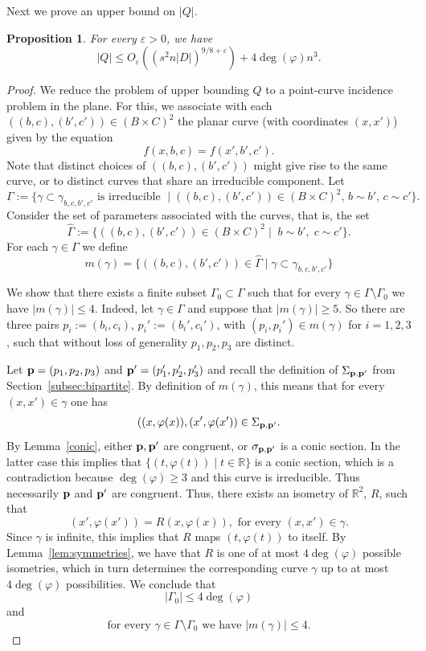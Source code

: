 \documentclass[letterpaper, reqno,11pt]{article}
\newcommand{\RR}{\mathbb{R}}
\newcommand{\eps}{\varepsilon}
\newcommand{\p}{{\bf p}}
\newtheorem{prop}[thm]{Proposition}
\theoremstyle{definition}
\theoremstyle{remark}
\begin{document}
Next we prove an upper bound on $|Q|$.
\begin{prop}\label{prop:upperQ}
For every $\eps>0$, we have
$$
|Q|\le O_\eps\left( (s^2n|D|)^{9/8+\eps}\right)+4\deg( \varphi) n^3.
$$
\end{prop}
\begin{proof}
We reduce the problem of upper bounding $Q$ to a point-curve incidence problem in the plane. 
For this, we associate with each $((b,c),(b',c'))\in  (B\times C)^2$ the planar curve (with coordinates $(x,x')$) given by the equation
$$
f(x,b,c)=f(x',b',c').
$$
Note that distinct choices of $((b,c),(b',c'))$ might give rise to the same curve, or to distinct curves that share an irreducible component. 
Let 
$$
\Gamma:=\{\text{$\gamma\subset \gamma_{b,c,b',c'}$ is irreducible }
\mid \text{$((b,c),(b',c'))\in (B\times C)^2$, $b\sim b'$, $c\sim c'$}\}.
$$
Consider the set of parameters associated with the curves, that is, the set
$$
\hat\Gamma:=\{((b,c),(b',c'))\in (B\times C)^2\mid \; b\sim b',\; c\sim c'\}.
$$
For each $\gamma\in \Gamma$ we define 
$$
m(\gamma)=\{((b,c),(b',c'))\in \hat\Gamma\mid \gamma\subset \gamma_{b,c,b',c'}\}
$$


We show that there exists a finite subset $\Gamma_0\subset \Gamma$ such that 
for every $\gamma\in\Gamma\setminus\Gamma_0$ we have $|m(\gamma)|\le 4$. 
Indeed, let $\gamma\in \Gamma$ and suppose that $|m(\gamma)|\ge 5$. 
So there are three pairs $p_i:=(b_i,c_i)$, $p_i':=(b_i',c_i')$, with $(p_i,p_i')\in m(\gamma)$ for $i=1,2,3$, such that without loss of generality $p_1,p_2,p_3$ are distinct.

Let $\p=(p_1,p_2,p_3)$ and $\p'=(p_1',p_2',p_3')$ and recall the definition of $\Sigma_{\p,\p'}$ from Section~\ref{subsec:bipartite}.
By definition of $m(\gamma)$, this means that for every $(x,x')\in \gamma$ one has
$$
((x,\varphi(x)), (x',\varphi(x'))\in \Sigma_{\p,\p'}.
$$
By Lemma~\ref{conic}, either $\p,\p'$ are congruent, or $\sigma_{\p,\p'}$ is a conic section. In the latter case this implies that $\{(t,\varphi(t))\mid t\in \RR\}$ is a conic section, which is a contradiction because $\deg(\varphi)\ge 3$ and this curve is irreducible. 
Thus necessarily $\p$ and $\p'$ are congruent. 
Thus, there exists an isometry of $\RR^2$, $R$, such that 
$$(x',\varphi(x'))=R(x,\varphi(x)),\text{ for every $(x,x')\in \gamma$.}
$$ 
Since $\gamma$ is infinite, this implies that $R$ maps $(t,\varphi(t))$ to itself.  
By Lemma~\ref{lem:symmetries}, we have that $R$ is one of at most $4\deg (\varphi)$ possible isometries, which in turn determines the corresponding curve $\gamma$ up to at most $4\deg (\varphi)$ possibilities. We conclude that
$$|\Gamma_0|\le 4\deg (\varphi)$$ and 
\begin{equation}
\text{for every 
$\gamma\in \Gamma\setminus\Gamma_0$ we have $|m(\gamma)|\le 4$.}
\end{equation}


\end{proof}
\end{document}
